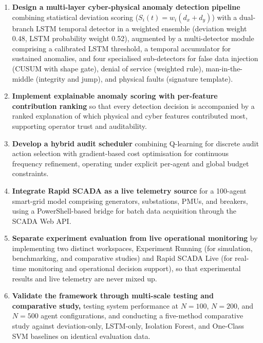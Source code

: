 \begin{enumerate}
    \item \textbf{Design a multi-layer cyber-physical anomaly detection pipeline} combining statistical deviation scoring ($S_i(t) = w_i(d_x + d_y)$) with a dual-branch LSTM temporal detector in a weighted ensemble (deviation weight 0.48, LSTM probability weight 0.52), augmented by a multi-detector module comprising a calibrated LSTM threshold, a temporal accumulator for sustained anomalies, and four specialised sub-detectors for false data injection (CUSUM with shape gate), denial of service (weighted rule), man-in-the-middle (integrity and jump), and physical faults (signature template).

    \item \textbf{Implement explainable anomaly scoring with per-feature contribution ranking} so that every detection decision is accompanied by a ranked explanation of which physical and cyber features contributed most, supporting operator trust and auditability.

    \item \textbf{Develop a hybrid audit scheduler} combining Q-learning for discrete audit action selection with gradient-based cost optimisation for continuous frequency refinement, operating under explicit per-agent and global budget constraints.

    \item \textbf{Integrate Rapid SCADA as a live telemetry source} for a 100-agent smart-grid model comprising generators, substations, PMUs, and breakers, using a PowerShell-based bridge for batch data acquisition through the SCADA Web API.

    \item \textbf{Separate experiment evaluation from live operational monitoring} by implementing two distinct workspaces, Experiment Running (for simulation, benchmarking, and comparative studies) and Rapid SCADA Live (for real-time monitoring and operational decision support), so that experimental results and live telemetry are never mixed up.

    \item \textbf{Validate the framework through multi-scale testing and comparative study,} testing system performance at $N = 100$, $N = 200$, and $N = 500$ agent configurations, and conducting a five-method comparative study against deviation-only, LSTM-only, Isolation Forest, and One-Class SVM baselines on identical evaluation data.
\end{enumerate}


